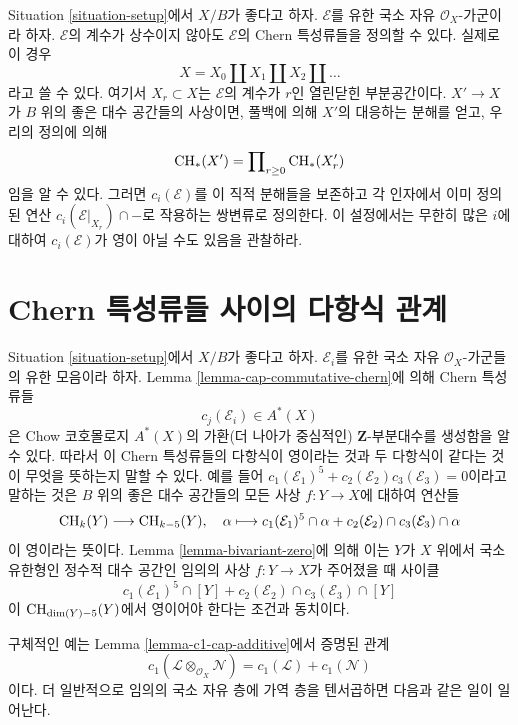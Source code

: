 \begin{remark}
\label{remark-extend-to-finite-locally-free}
Situation \ref{situation-setup}에서 $X/B$가 좋다고 하자.
$\mathcal{E}$를 유한 국소 자유 $\mathcal{O}_X$-가군이라 하자.
$\mathcal{E}$의 계수가 상수이지 않아도 $\mathcal{E}$의 Chern
특성류들을 정의할 수 있다. 실제로 이 경우
$$
X = X_0 \amalg X_1 \amalg X_2 \amalg \ldots
$$
라고 쓸 수 있다. 여기서 $X_r \subset X$는
$\mathcal{E}$의 계수가 $r$인 열린닫힌 부분공간이다.
$X' \to X$가 $B$ 위의 좋은 대수 공간들의 사상이면, 풀백에 의해
$X'$의 대응하는 분해를 얻고, 우리의 정의에 의해
$$
\mathop{\mathrm{CH}}\nolimits_*(X') = \prod\nolimits_{r \geq 0} \mathop{\mathrm{CH}}\nolimits_*(X'_r)
$$
임을 알 수 있다. 그러면 $c_i(\mathcal{E})$를 이 직적 분해들을
보존하고 각 인자에서 이미 정의된 연산
$c_i(\mathcal{E}|_{X_r}) \cap -$로 작용하는 쌍변류로 정의한다.
이 설정에서는 무한히 많은 $i$에 대하여
$c_i(\mathcal{E})$가 영이 아닐 수도 있음을 관찰하라.
\end{remark}

\section{Chern 특성류들 사이의 다항식 관계}
\label{section-relations-chern-classes}

\noindent
Situation \ref{situation-setup}에서 $X/B$가 좋다고 하자.
$\mathcal{E}_i$를 유한 국소 자유 $\mathcal{O}_X$-가군들의
유한 모음이라 하자. Lemma \ref{lemma-cap-commutative-chern}에 의해
Chern 특성류들
$$
c_j(\mathcal{E}_i) \in A^*(X)
$$
은 Chow 코호몰로지 $A^*(X)$의 가환(더 나아가 중심적인)
$\mathbf{Z}$-부분대수를 생성함을 알 수 있다.
따라서 이 Chern 특성류들의 다항식이 영이라는 것과 두 다항식이
같다는 것이 무엇을 뜻하는지 말할 수 있다. 예를 들어
$c_1(\mathcal{E}_1)^5 + c_2(\mathcal{E}_2)c_3(\mathcal{E}_3) = 0$이라고
말하는 것은 $B$ 위의 좋은 대수 공간들의 모든 사상
$f : Y \to X$에 대하여 연산들
$$
\mathop{\mathrm{CH}}\nolimits_k(Y) \longrightarrow \mathop{\mathrm{CH}}\nolimits_{k - 5}(Y), \quad
\alpha \longmapsto
c_1(\mathcal{E}_1)^5 \cap \alpha +
c_2(\mathcal{E}_2) \cap c_3(\mathcal{E}_3) \cap \alpha
$$
이 영이라는 뜻이다. Lemma \ref{lemma-bivariant-zero}에 의해 이는
$Y$가 $X$ 위에서 국소 유한형인 정수적 대수 공간인 임의의 사상
$f : Y \to X$가 주어졌을 때 사이클
$$
c_1(\mathcal{E}_1)^5 \cap [Y] +
c_2(\mathcal{E}_2) \cap c_3(\mathcal{E}_3) \cap [Y]
$$
이 $\mathop{\mathrm{CH}}\nolimits_{\dim(Y) - 5}(Y)$에서 영이어야 한다는 조건과 동치이다.

\medskip\noindent
구체적인 예는 Lemma \ref{lemma-c1-cap-additive}에서 증명된 관계
$$
c_1(\mathcal{L} \otimes_{\mathcal{O}_X} \mathcal{N})
=
c_1(\mathcal{L}) + c_1(\mathcal{N})
$$
이다. 더 일반적으로 임의의 국소 자유 층에 가역 층을 텐서곱하면
다음과 같은 일이 일어난다.

